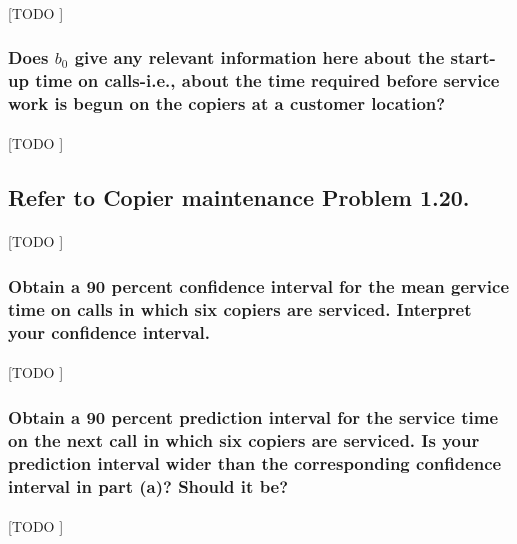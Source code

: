 \documentclass{article}
\begin{document}
        \paragraph{}
        [TODO ]

      \subsubsection{Does $b_0$ give any relevant information here about the start-up time on calls-i.e., about the time required before service work is begun on the copiers at a customer location?}

        \paragraph{}
        [TODO ]

    \setcounter{subsection}{13}
    \subsection{Refer to \textbf{Copier maintenance} Problem 1.20.}

      \paragraph{}
      [TODO ]

      \subsubsection{Obtain a 90 percent confidence interval for the mean gervice time on calls in which six copiers are serviced. Interpret your confidence interval.}

        \paragraph{}
        [TODO ]

      \subsubsection{Obtain a 90 percent prediction interval for the service time on the next call in which six copiers are serviced. Is your prediction interval wider than the corresponding confidence interval in part (a)? Should it be?}

        \paragraph{}
        [TODO ]
\end{document}

